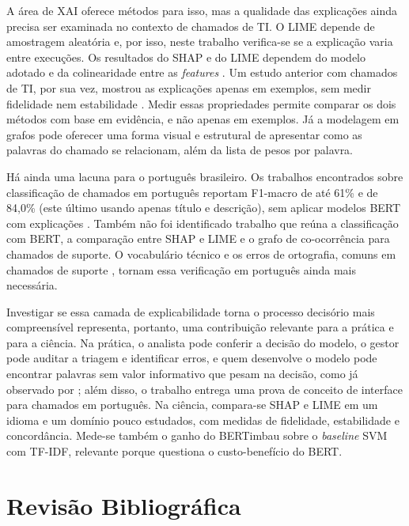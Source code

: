 \documentclass[
    12pt,                %
    openright,           %
    oneside,             %
    a4paper,             %
    english,             %
    brazil               %
]{abntex2}
\begin{document}
A área de XAI oferece métodos para isso, mas a qualidade das explicações ainda precisa ser examinada no contexto de chamados de TI. O LIME depende de amostragem aleatória \cite{ribeiro2016} e, por isso, neste trabalho verifica-se se a explicação varia entre execuções. Os resultados do SHAP e do LIME dependem do modelo adotado e da colinearidade entre as \textit{features} \cite{salih2023}. Um estudo anterior com chamados de TI, por sua vez, mostrou as explicações apenas em exemplos, sem medir fidelidade nem estabilidade \cite{razma2026}. Medir essas propriedades permite comparar os dois métodos com base em evidência, e não apenas em exemplos. Já a modelagem em grafos pode oferecer uma forma visual e estrutural de apresentar como as palavras do chamado se relacionam, além da lista de pesos por palavra.

Há ainda uma lacuna para o português brasileiro. Os trabalhos encontrados sobre classificação de chamados em português reportam F1-macro de até 61\% e de 84,0\% (este último usando apenas título e descrição), sem aplicar modelos BERT com explicações \cite{yokota2025, carvalho2026}. Também não foi identificado trabalho que reúna a classificação com BERT, a comparação entre SHAP e LIME e o grafo de co-ocorrência para chamados de suporte. O vocabulário técnico e os erros de ortografia, comuns em chamados de suporte \cite{zemp2021}, tornam essa verificação em português ainda mais necessária.

Investigar se essa camada de explicabilidade torna o processo decisório mais compreensível representa, portanto, uma contribuição relevante para a prática e para a ciência. Na prática, o analista pode conferir a decisão do modelo, o gestor pode auditar a triagem e identificar erros, e quem desenvolve o modelo pode encontrar palavras sem valor informativo que pesam na decisão, como já observado por ; além disso, o trabalho entrega uma prova de conceito de interface para chamados em português. Na ciência, compara-se SHAP e LIME em um idioma e um domínio pouco estudados, com medidas de fidelidade, estabilidade e concordância. Mede-se também o ganho do BERTimbau sobre o \textit{baseline} SVM com TF-IDF, relevante porque  questiona o custo-benefício do BERT.

\chapter{Revisão Bibliográfica}
\label{cap:revisao}
\end{document}
